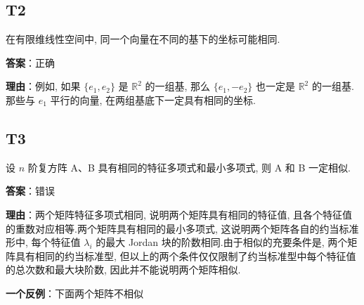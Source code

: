 \documentclass{article}
\begin{document}
\subsection{T2}

\par 在有限维线性空间中, 同一个向量在不同的基下的坐标可能相同.

\par \textbf{答案}：正确

\par \textbf{理由}：例如, 如果 $\{e_1, e_2\}$ 是 $\mathbb R^2$ 的一组基, 那么 \(\{e_1, -e_2\}\) 也一定是 $\mathbb R^2$ 的一组基.那些与 $e_1$ 平行的向量, 在两组基底下一定具有相同的坐标.

\subsection{T3}

\par 设 $n$ 阶复方阵 A、B 具有相同的特征多项式和最小多项式, 则 A 和 B 一定相似.

\par \textbf{答案}：错误

\par \textbf{理由}：两个矩阵特征多项式相同, 说明两个矩阵具有相同的特征值, 且各个特征值的重数对应相等.两个矩阵具有相同的最小多项式, 这说明两个矩阵各自的约当标准形中, 每个特征值 $\lambda_i$ 的最大 Jordan 块的阶数相同.由于相似的充要条件是, 两个矩阵具有相同的约当标准型, 但以上的两个条件仅仅限制了约当标准型中每个特征值的总次数和最大块阶数, 因此并不能说明两个矩阵相似.

\par \textbf{一个反例}：下面两个矩阵不相似
\end{document}
